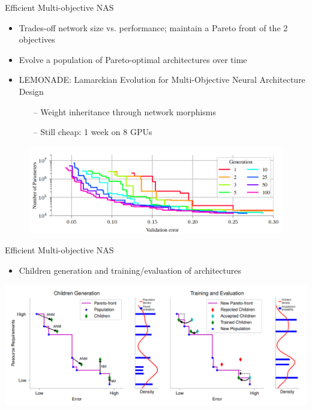 \begin{frame}{Efficient Multi-objective NAS }
    \begin{itemize}
    	\item Trades-off network size vs. performance; maintain a \alert{Pareto front} of the \alert{2 objectives}
	\item Evolve a population of Pareto-optimal architectures over time
	\item \alert{LEMONADE}: Lamarckian Evolution for Multi-Objective Neural Architecture Design
	\begin{itemize}
		\item[--] Weight inheritance through network morphisms
		\item[--] Still cheap: 1 week on 8 GPUs
	\end{itemize}

    \end{itemize}

    \begin{figure}[t]
        \begin{centering}
            \includegraphics[scale=0.3]{images_lec7/lemonade.png}
        \end{centering}
    \end{figure}

\end{frame}

\begin{frame}[c]{Efficient Multi-objective NAS }
\begin{itemize}
	\item Children generation and training/evaluation of architectures 
\end{itemize}

\begin{centering}
    \includegraphics[scale=0.27]{images_lec7/lemonade_2.png}
\end{centering}

\end{frame}

